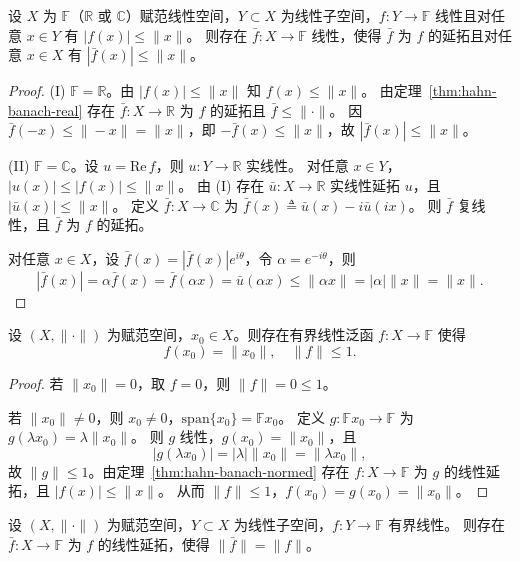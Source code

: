 \documentclass[lang=cn,a4paper,newtx,section]{elegantbook}
\begin{document}
\begin{theorem}\label{thm:hahn-banach-normed}
  设 $X$ 为 $\mathbb{F}$（$\mathbb{R}$ 或 $\mathbb{C}$）赋范线性空间，$Y\subset X$ 为线性子空间，$f:Y\to\mathbb{F}$ 线性且对任意 $x\in Y$ 有 $|f(x)|\le\|x\|$。
  则存在 $\bar{f}:X\to\mathbb{F}$ 线性，使得 $\bar{f}$ 为 $f$ 的延拓且对任意 $x\in X$ 有 $|\bar{f}(x)|\le\|x\|$。
\end{theorem}

\begin{proof}
  (I) $\mathbb{F}=\mathbb{R}$。由 $|f(x)|\le\|x\|$ 知 $f(x)\le\|x\|$。
  由定理~\ref{thm:hahn-banach-real} 存在 $\bar{f}:X\to\mathbb{R}$ 为 $f$ 的延拓且 $\bar{f}\le\|\cdot\|$。
  因 $\bar{f}(-x)\le\|-x\|=\|x\|$，即 $-\bar{f}(x)\le\|x\|$，故 $|\bar{f}(x)|\le\|x\|$。

  (II) $\mathbb{F}=\mathbb{C}$。设 $u=\mathrm{Re}\,f$，则 $u:Y\to\mathbb{R}$ 实线性。
  对任意 $x\in Y$，$|u(x)|\le|f(x)|\le\|x\|$。
  由 (I) 存在 $\bar{u}:X\to\mathbb{R}$ 实线性延拓 $u$，且 $|\bar{u}(x)|\le\|x\|$。
  定义 $\bar{f}:X\to\mathbb{C}$ 为 $\bar{f}(x)\triangleq\bar{u}(x)-i\bar{u}(ix)$。
  则 $\bar{f}$ 复线性，且 $\bar{f}$ 为 $f$ 的延拓。

  对任意 $x\in X$，设 $\bar{f}(x)=|\bar{f}(x)|e^{i\theta}$，令 $\alpha=e^{-i\theta}$，则
  \[
    |\bar{f}(x)|=\alpha\bar{f}(x)=\bar{f}(\alpha x)=\bar{u}(\alpha x)\le\|\alpha x\|=|\alpha|\|x\|=\|x\|.
  \]
\end{proof}

\begin{theorem}
  设 $(X,\|\cdot\|)$ 为赋范空间，$x_0\in X$。则存在有界线性泛函 $f:X\to\mathbb{F}$ 使得
  \[
    f(x_0)=\|x_0\|,\quad\|f\|\le 1.
  \]
\end{theorem}

\begin{proof}
  若 $\|x_0\|=0$，取 $f=0$，则 $\|f\|=0\le 1$。

  若 $\|x_0\|\ne 0$，则 $x_0\ne 0$，$\mathrm{span}\{x_0\}=\mathbb{F}x_0$。
  定义 $g:\mathbb{F}x_0\to\mathbb{F}$ 为 $g(\lambda x_0)=\lambda\|x_0\|$。
  则 $g$ 线性，$g(x_0)=\|x_0\|$，且
  \[
    |g(\lambda x_0)|=|\lambda|\|x_0\|=\|\lambda x_0\|,
  \]
  故 $\|g\|\le 1$。由定理~\ref{thm:hahn-banach-normed} 存在 $f:X\to\mathbb{F}$ 为 $g$ 的线性延拓，且 $|f(x)|\le\|x\|$。
  从而 $\|f\|\le 1$，$f(x_0)=g(x_0)=\|x_0\|$。
\end{proof}

\begin{theorem}
  设 $(X,\|\cdot\|)$ 为赋范空间，$Y\subset X$ 为线性子空间，$f:Y\to\mathbb{F}$ 有界线性。
  则存在 $\bar{f}:X\to\mathbb{F}$ 为 $f$ 的线性延拓，使得 $\|\bar{f}\|=\|f\|$。
\end{theorem}
\end{document}
